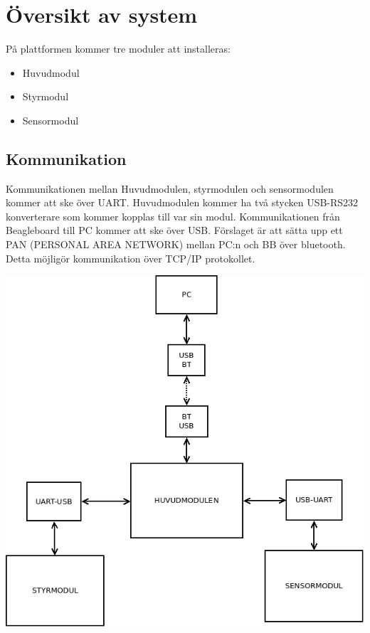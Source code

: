 \section{Översikt av system}
På plattformen kommer tre moduler att installeras:

\begin{itemize}
\item Huvudmodul
\item Styrmodul
\item Sensormodul
\end{itemize}
\subsection{Kommunikation}
Kommunikationen mellan Huvudmodulen, styrmodulen och sensormodulen kommer att ske över UART. Huvudmodulen kommer ha två stycken USB-RS232 konverterare som kommer kopplas till var sin modul. Kommunikationen från Beagleboard till PC kommer att ske över USB. Förslaget är att sätta upp ett PAN (PERSONAL AREA NETWORK) mellan PC:n och BB över bluetooth. Detta möjligör kommunikation över TCP/IP protokollet.
\newline
\centerline{\includegraphics[scale=0.4]{FLOW1PNG}}
